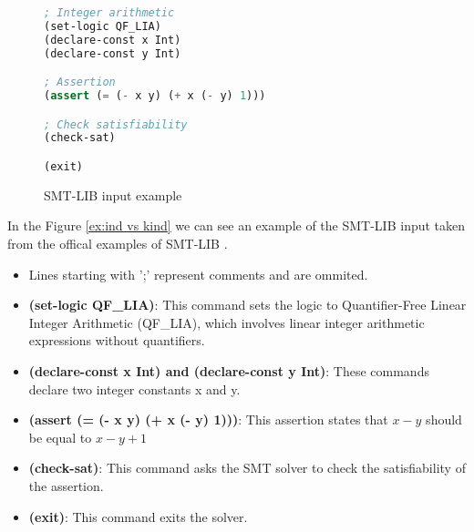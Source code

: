 \begin{figure}[h]
\begin{mdframed}
\begin{lstlisting}[language=Lisp]
; Integer arithmetic
(set-logic QF_LIA)
(declare-const x Int)
(declare-const y Int)

; Assertion
(assert (= (- x y) (+ x (- y) 1)))

; Check satisfiability
(check-sat)

(exit)
\end{lstlisting}
\end{mdframed}
\caption{SMT-LIB input example}
\end{figure}

In the Figure \ref{ex:ind vs kind} we can see an example of the SMT-LIB input taken from the offical examples of SMT-LIB\cite{BarFT-SMTLIB} .\begin{itemize}
\item Lines starting with ';' represent comments and are ommited.
\item \textbf{(set-logic QF\_LIA)}: This command sets the logic to Quantifier-Free Linear Integer Arithmetic (QF\_LIA), which involves linear integer arithmetic expressions without quantifiers.
\item \textbf{(declare-const x Int) and (declare-const y Int)}: These commands declare two integer constants x and y.
\item \textbf{(assert (= (- x y) (+ x (- y) 1)))}: This assertion states that $x - y$ should be equal to $x - y + 1$
\item \textbf{(check-sat)}: This command asks the SMT solver to check the satisfiability of the assertion.
\item \textbf{(exit)}: This command exits the solver.
\end{itemize}
